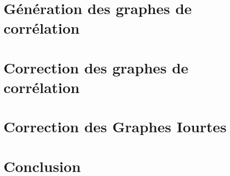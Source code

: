 \documentclass[onecolumn, 12pt]{book}
\begin{document}
\section{G\'en\'eration des graphes de corr\'elation}


\section{Correction des graphes de corr\'elation}


\section{Correction des Graphes Iourtes}


\section{Conclusion}
\end{document}
